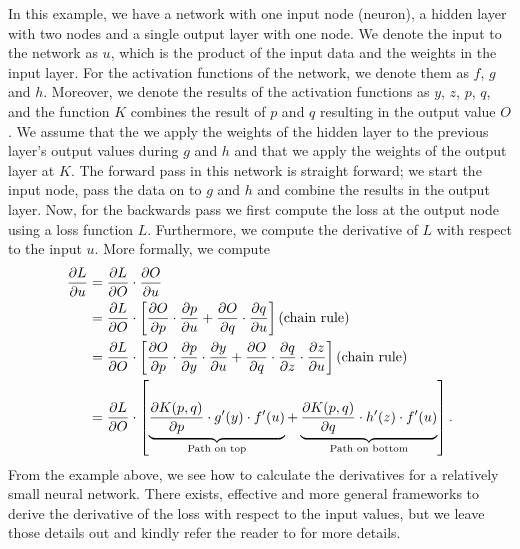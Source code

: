 In this example, we have a network with one input node (neuron), a hidden layer with two nodes and a single output layer with one node. We denote the input to the network as $u$, which is the product of the input data and the weights in the input layer. For the activation functions of the network, we denote them as $f$, $g$ and $h$. Moreover, we denote the results of the activation functions as $y$, $z$, $p$, $q$, and the function $K$ combines the result of $p$ and $q$ resulting in the output value $O$. We assume that the we apply the weights of the hidden layer to the previous layer's output values during $g$ and $h$ and that we apply the weights of the output layer at $K$. The forward pass in this network is straight forward; we start the input node, pass the data on to $g$ and $h$ and combine the results in the output layer. Now, for the backwards pass we first compute the loss at the output node using a loss function $L$. Furthermore, we compute the derivative of $L$ with respect to the input $u$. More formally, we compute
\begin{align}
    \parder{L}{u}
    &= \parder{L}{O} \cdot \parder{O}{u} \\
    &= \parder{L}{O} \cdot \left[
    \parder{O}{p} \cdot \parder{p}{u} +
    \parder{O}{q} \cdot \parder{q}{u}
    \right] \text{(chain rule)} \\
    &= \parder{L}{O} \cdot \left[
    \parder{O}{p} \cdot \parder{p}{y} \cdot \parder{y}{u} + 
    \parder{O}{q} \cdot \parder{q}{z} \cdot \parder{z}{u}
    \right] \text{(chain rule)} \\
    &= \parder{L}{O} \cdot \left[
    \undertext{\parder{K(p, q)}{p} \cdot g'(y) \cdot f'(u)}{Path on top} + 
    \undertext{\parder{K(p, q)}{q} \cdot h'(z) \cdot f'(u)}{Path on bottom}
    \right].
\end{align}
From the example above, we see how to calculate the derivatives for a relatively small neural network. There exists, effective and more general frameworks to derive the derivative of the loss with respect to the input values, but we leave those details out and kindly refer the reader to \cite[Chapter 1.3]{Aggarwal18} for more details.


